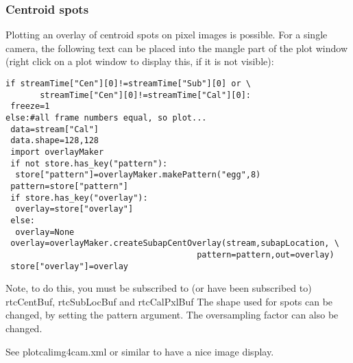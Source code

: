 \documentclass[a4,10pt]{article}
\newcommand{\ignore}[1]{}
\begin{document}
\subsubsection{Centroid spots}
\ignore{
Plotting overlay of centroid spots on pixel images:  e.g. for a single
camera, 128x128 pixels, use:
data.shape=128,128;overlay.shape=128,128,4
Can use spot module to change the shape of the spots...
e.g.
\begin{verbatim}
data.shape=128,128
overlay.shape=128,128,4;import spot;overlay=spot.expandPoints(overlay)
spot.expandPoints can take ``cross'' or ``circ'' as 2nd argument
(typ), and an odd number as 3rd argument, diam.  Alternatively, a spot
shape can be passed to sh, e.g.
spot.expandPoints(overlay,sh=numpy.ones((3,3,4))) to create a white square.

Or, you can set self.centOverlayPattern to be whatever you want,
currently using the command panel, though this will probably become a
config option.  Shape is x,y,4.  e.g.
self.centOverlayPattern=numpy.zeros((8,8,4),"f")
self.centOverlayPattern[:,:]=1
self.centOverlayPattern[2:6,2:6,2]=0
self.centOverlayPattern[0::7,0::7]=0
\end{verbatim}
to get fried eggs.
}

Plotting an overlay of centroid spots on pixel images is possible.
For a single camera, the following text can be placed into the mangle
part of the plot window (right click on a plot window to display this,
if it is not visible):
\begin{verbatim}
if streamTime["Cen"][0]!=streamTime["Sub"][0] or \
       streamTime["Cen"][0]!=streamTime["Cal"][0]:
 freeze=1
else:#all frame numbers equal, so plot...
 data=stream["Cal"]
 data.shape=128,128
 import overlayMaker
 if not store.has_key("pattern"):
  store["pattern"]=overlayMaker.makePattern("egg",8)
 pattern=store["pattern"]
 if store.has_key("overlay"):
  overlay=store["overlay"]
 else:
  overlay=None
 overlay=overlayMaker.createSubapCentOverlay(stream,subapLocation, \
                                       pattern=pattern,out=overlay)
 store["overlay"]=overlay
\end{verbatim}

Note, to do this, you must be subscribed to (or have been subscribed
to) rtcCentBuf, rtcSubLocBuf and rtcCalPxlBuf
The shape used for spots can be changed, by setting the pattern
argument.  The oversampling factor can also be changed.

See plotcalimg4cam.xml or similar to have a nice image display.
\end{document}
